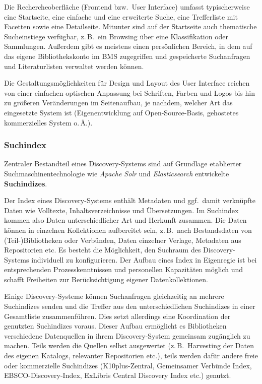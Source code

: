 \documentclass[
  11pt,
  letterpaper,
  DIV=11,
  twoside]{scrreprt}
\begin{document}
Die Rechercheoberfläche (Frontend bzw.~User Interface) umfasst
typischerweise eine Startseite, eine einfache und eine erweiterte Suche,
eine Trefferliste mit Facetten sowie eine Detailseite. Mitunter sind auf
der Startseite auch thematische Sucheinstiege verfügbar, z.\,B.~ein
Browsing über eine Klassifikation oder Sammlungen. Außerdem gibt es
meistens einen persönlichen Bereich, in dem auf das eigene
Bibliothekskonto im BMS zugegriffen und gespeicherte Suchanfragen und
Literaturlisten verwaltet werden können.

Die Gestaltungsmöglichkeiten für Design und Layout des User Interface
reichen von einer einfachen optischen Anpassung bei Schriften, Farben
und Logos bis hin zu größeren Veränderungen im Seitenaufbau, je nachdem,
welcher Art das eingesetzte System ist (Eigenentwicklung auf
Open-Source-Basis, gehostetes kommerzielles System o.\,Ä.).

\subsubsection{Suchindex}\label{suchindex}

Zentraler Bestandteil eines Discovery-Systems sind auf Grundlage
etablierter Suchmaschinentechnologie wie \emph{Apache Solr} und
\emph{Elasticsearch} entwickelte \textbf{Suchindizes}.

Der Index eines Discovery-Systems enthält Metadaten und ggf.~damit
verknüpfte Daten wie Volltexte, Inhaltsverzeichnisse und Übersetzungen.
Im Suchindex kommen also Daten unterschiedlicher Art und Herkunft
zusammen. Die Daten können in einzelnen Kollektionen aufbereitet sein,
z.\,B.~nach Bestandsdaten von (Teil-)Bibliotheken oder Verbünden, Daten
einzelner Verlage, Metadaten aus Repositorien etc. Es besteht die
Möglichkeit, den Suchraum des Discovery-Systems individuell zu
konfigurieren. Der Aufbau eines Index in Eigenregie ist bei
entsprechenden Prozesskenntnissen und personellen Kapazitäten möglich
und schafft Freiheiten zur Berücksichtigung eigener Datenkollektionen.

Einige Discovery-Systeme können Suchanfragen gleichzeitig an mehrere
Suchindizes senden und die Treffer aus den unterschiedlichen Suchindizes
in einer Gesamtliste zusammenführen. Dies setzt allerdings eine
Koordination der genutzten Suchindizes voraus. Dieser Aufbau ermöglicht
es Bibliotheken verschiedene Datenquellen in ihrem Discovery-System
gemeinsam zugänglich zu machen. Teils werden die Quellen selbst
ausgewertet (z.\,B.~Harvesting der Daten des eigenen Katalogs,
relevanter Repositorien etc.), teils werden dafür andere freie oder
kommerzielle Suchindizes (K10plus-Zentral, Gemeinsamer Verbünde Index,
EBSCO-Discovery-Index, ExLibris Central Discovery Index etc.) genutzt.
\end{document}
